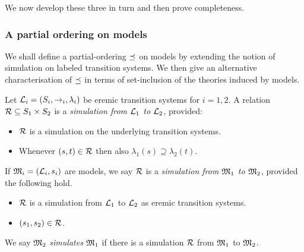 \NI We now develop these three in turn and then prove completeness.

\subsubsection{A partial ordering on models}

We shall define a partial-ordering $\preceq$ on models by extending
the notion of simulation on labeled transition systems. We then give
an alternative characterisation of $\preceq$ in terms of
set-inclusion of the theories induced by models.

\begin{definition}
Let $\mathcal{L}_i = (S_i, \rightarrow_i, \lambda_i)$ be eremic transition
systems for $i = 1, 2$.  A relation $\mathcal{R} \subseteq S_1 \times S_2$ is
a \emph{simulation from $\mathcal{L}_1$ to $\mathcal{L}_2$}, provided:
\begin{itemize} 

\item $\mathcal{R}$ is a simulation on the underlying transition systems. 

\item Whenever $(s, t) \in \mathcal{R}$ then also $\lambda_1(s) \supseteq
  \lambda_2(t)$.

\end{itemize}

\NI If $\frak{M}_i = (\mathcal{L}_i, s_i)$ are models, we say $\mathcal{R}$ is a
\emph{simulation from $\frak{M}_1$ to $\frak{M}_2$}, provided the following hold.

\begin{itemize}

\item $\mathcal{R}$ is a simulation from $\mathcal{L}_1$ to $\mathcal{L}_2$ as eremic transition systems.

\item  $(s_1, s_2) \in \mathcal{R}$. 

\end{itemize}

\NI We say $\frak{M}_2$ \emph{simulates} $\frak{M}_1$ if there is a simulation $\mathcal{R}$ 
from $\frak{M}_1$ to $\frak{M}_2$.



\end{definition}

